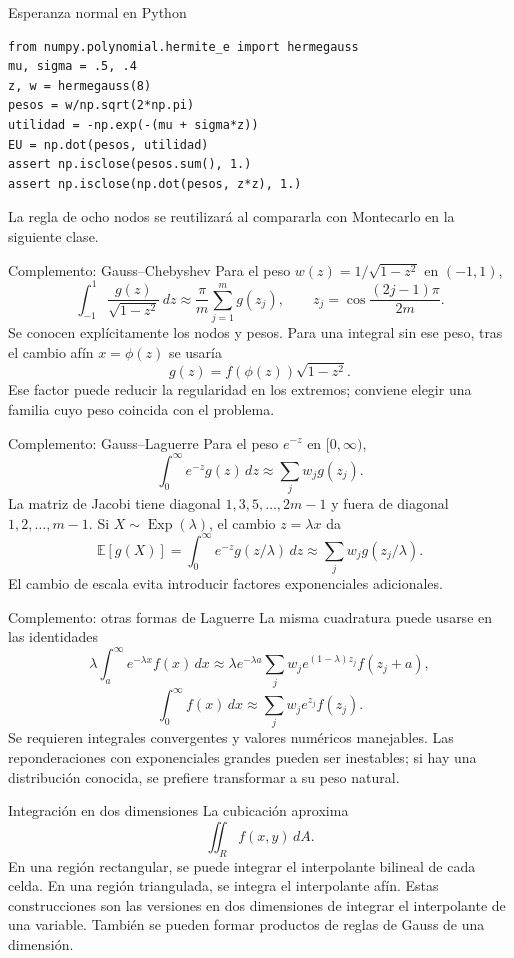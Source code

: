 \documentclass[aspectratio=169,12pt]{beamer}
\begin{document}
\begin{frame}[fragile]{Esperanza normal en Python}
\begin{lstlisting}
from numpy.polynomial.hermite_e import hermegauss
mu, sigma = .5, .4
z, w = hermegauss(8)
pesos = w/np.sqrt(2*np.pi)
utilidad = -np.exp(-(mu + sigma*z))
EU = np.dot(pesos, utilidad)
assert np.isclose(pesos.sum(), 1.)
assert np.isclose(np.dot(pesos, z*z), 1.)
\end{lstlisting}
La regla de ocho nodos se reutilizará al compararla con Montecarlo en la siguiente clase.
\end{frame}

\begin{frame}{Complemento: Gauss--Chebyshev}
Para el peso $w(z)=1/\sqrt{1-z^2}$ en $(-1,1)$,
\[\int_{-1}^1\frac{g(z)}{\sqrt{1-z^2}}\,dz
\approx\frac\pi m\sum_{j=1}^m g(z_j),\qquad
z_j=\cos\frac{(2j-1)\pi}{2m}.\]
Se conocen explícitamente los nodos y pesos.
Para una integral sin ese peso, tras el cambio afín $x=\phi(z)$ se usaría
\[g(z)=f(\phi(z))\sqrt{1-z^2}.\]
Ese factor puede reducir la regularidad en los extremos; conviene elegir
una familia cuyo peso coincida con el problema.
\end{frame}

\begin{frame}{Complemento: Gauss--Laguerre}
Para el peso $e^{-z}$ en $[0,\infty)$,
\[\int_0^\infty e^{-z}g(z)\,dz\approx\sum_jw_jg(z_j).\]
La matriz de Jacobi tiene diagonal $1,3,5,\ldots,2m-1$
y fuera de diagonal $1,2,\ldots,m-1$.
Si $X\sim\operatorname{Exp}(\lambda)$, el cambio $z=\lambda x$ da
\[\mathbb E[g(X)]=\int_0^\infty e^{-z}g(z/\lambda)\,dz
\approx\sum_jw_jg(z_j/\lambda).\]
El cambio de escala evita introducir factores exponenciales adicionales.
\end{frame}

\begin{frame}{Complemento: otras formas de Laguerre}
La misma cuadratura puede usarse en las identidades
\[\lambda\int_a^\infty e^{-\lambda x}f(x)\,dx
\approx\lambda e^{-\lambda a}\sum_jw_je^{(1-\lambda)z_j}f(z_j+a),\]
\[\int_0^\infty f(x)\,dx\approx\sum_jw_je^{z_j}f(z_j).\]
Se requieren integrales convergentes y valores numéricos manejables.
Las reponderaciones con exponenciales grandes pueden ser inestables;
si hay una distribución conocida, se prefiere transformar a su peso natural.
\end{frame}

\begin{frame}{Integración en dos dimensiones}
La cubicación aproxima
\[\iint_R f(x,y)\,dA.\]
En una región rectangular, se puede integrar el interpolante bilineal de
cada celda. En una región triangulada, se integra el interpolante afín.
Estas construcciones son las versiones en dos dimensiones de integrar
el interpolante de una variable.
También se pueden formar productos de reglas de Gauss de una dimensión.
\end{frame}
\end{document}
